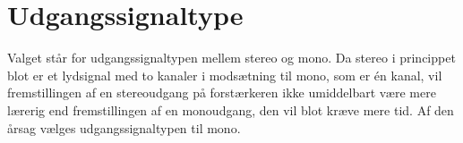 \section{Udgangssignaltype}
\label{valg_udgangssignaltype}
Valget står for udgangssignaltypen mellem stereo og mono. Da stereo i princippet blot er et lydsignal med to kanaler i modsætning til mono, som er én kanal, vil fremstillingen af en stereoudgang på forstærkeren ikke umiddelbart være mere lærerig end fremstillingen af en monoudgang, den vil blot kræve mere tid. Af den årsag vælges udgangssignaltypen til mono.